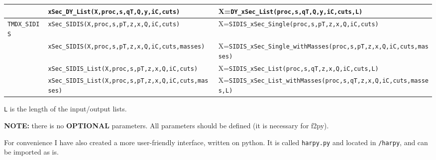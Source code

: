 \documentclass[prd,nofootinbib,eqsecnum,final]{revtex4}
\renewcommand{\(}{\left(}
\renewcommand{\)}{\right)}
\renewcommand{\[}{\left[}
\renewcommand{\]}{\right]}
\newcommand{\red}[1]{{\color[rgb]{1,0,0} #1}}
\begin{document}
\begin{center}
\begin{longtable}{|l|l||p{6cm}|}
 & \texttt{xSec\_DY\_List(X,proc,s,qT,Q,y,iC,cuts)} & X=\texttt{DY\_xSec\_List(proc,s,qT,Q,y,iC,cuts,L)}
\\\hline
\texttt{TMDX\_SIDIS} & \texttt{xSec\_SIDIS(X,proc,s,pT,z,x,Q,iC,cuts)} & X=\texttt{SIDIS\_xSec\_Single(proc,s,pT,z,x,Q,iC,cuts)}
\\
\cline{2-3}
& \texttt{xSec\_SIDIS(X,proc,s,pT,z,x,Q,iC,cuts,masses)} & X=\texttt{SIDIS\_xSec\_Single\_withMasses(proc,s,pT,z,x,Q,iC,cuts,masses)}
\\\cline{2-3}
 & \texttt{xSec\_SIDIS\_List(X,proc,s,pT,z,x,Q,iC,cuts)} & X=\texttt{SIDIS\_xSec\_List(proc,s,qT,z,x,Q,iC,cuts,L)}
\\\cline{2-3}
 & \texttt{xSec\_SIDIS\_List(X,proc,s,pT,z,x,Q,iC,cuts,masses)} & X=\texttt{SIDIS\_xSec\_List\_withMasses(proc,s,qT,z,x,Q,iC,cuts,masses,L)}
\end{longtable}
\end{center}
\texttt{L} is the length of the input/output lists.

\red{\textbf{NOTE:} there is no \textbf{OPTIONAL} parameters. All parameters should be defined (it is necessary for f2py).}

\begin{tcolorbox}
For convenience I have also created a more user-friendly interface, written on python. It is called \texttt{harpy.py} and located in \texttt{/harpy}, and can be imported as is.
\end{tcolorbox}

\clearpage
\end{document}
